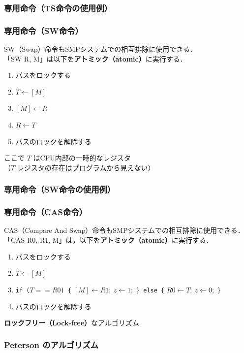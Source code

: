 \documentclass{beamer}                   %
\begin{document}
\begin{frame}
  \frametitle{専用命令（TS命令の使用例）}
  
\end{frame}

\begin{frame}
  \frametitle{専用命令（SW命令）}
  SW（Swap）命令もSMPシステムでの相互排除に使用できる．\\
  「SW  R, M」は以下を{\bf アトミック（atomic）}に実行する．
  \begin{enumerate}
  \item バスをロックする
  \item $T \leftarrow [M]$
  \item $[M] \leftarrow R$
  \item $R \leftarrow T$
  \item バスのロックを解除する
  \end{enumerate}
  ここで $T$ はCPU内部の一時的なレジスタ\\
  （$T$ レジスタの存在はプログラムから見えない）
\end{frame}

\begin{frame}
  \frametitle{専用命令（SW命令の使用例）}
  
\end{frame}

\begin{frame}
  \frametitle{専用命令（CAS命令）}
  CAS（Compare And Swap）命令もSMPシステムでの相互排除に使用できる．
  「CAS  R0, R1, M」は，以下を{\bf アトミック（atomic）}に実行する．
  \begin{enumerate}
  \item バスをロックする
  \item $T \leftarrow [M]$
  \item {\tt if ($T==R0$) \{} $[M] \leftarrow R1;~ z \leftarrow 1;$
    {\tt \} else \{} $R0 \leftarrow T;~  z \leftarrow 0;$ {\tt \}}
  \item バスのロックを解除する
  \end{enumerate}
  \vspace{1em}
  
  {\bf ロックフリー（Lock-free）}なアルゴリズム
\end{frame}

\begin{frame}
  \frametitle{Peterson のアルゴリズム}
  
\end{frame}
\end{document}

